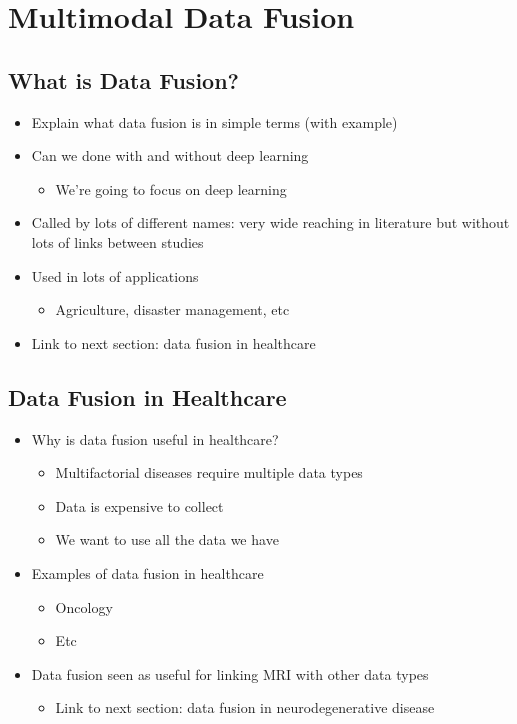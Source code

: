 \section{Multimodal Data Fusion}

\subsection{What is Data Fusion?}

\begin{itemize}
    \item Explain what data fusion is in simple terms (with example)
    \item Can we done with and without deep learning
    \begin{itemize}
        \item We're going to focus on deep learning
    \end{itemize}
    \item Called by lots of different names: very wide reaching in literature but without lots of links between studies
    \item Used in lots of applications
    \begin{itemize}
        \item Agriculture, disaster management, etc
    \end{itemize}
    \item Link to next section: data fusion in healthcare
\end{itemize}
\subsection{Data Fusion in Healthcare}

\begin{itemize}
    \item Why is data fusion useful in healthcare?
    \begin{itemize}
        \item Multifactorial diseases require multiple data types
        \item Data is expensive to collect
        \item We want to use all the data we have
    \end{itemize}
    \item Examples of data fusion in healthcare
    \begin{itemize}
        \item Oncology
        \item Etc
    \end{itemize}
    \item Data fusion seen as useful for linking MRI with other data types
    \begin{itemize}
        \item Link to next section: data fusion in neurodegenerative disease
    \end{itemize}
\end{itemize}

